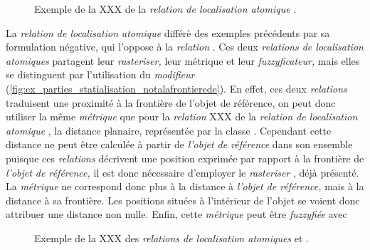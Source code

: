 \begin{figure}
  \centering  
  \caption{Exemple de la XXX de la \emph{relation de localisation
      atomique} \protect{}.}
  \label{fig:ex_parties_statialisation_dansplani}
\end{figure}

La \emph{relation de localisation atomique}
 différè des exemples
précédents par sa formulation négative, qui l'oppose à la
\emph{relation} . Ces deux
\emph{relations de localisation atomiques} partagent leur
\emph{rasteriser,} leur métrique et leur \emph{fuzzyficateur,} mais
elles se distinguent par l'utilisation du \emph{modifieur}
(\autoref{fig:ex_parties_statialisation_notalafrontierede}). En effet,
ces deux \emph{relations} traduisent une proximité à la frontière de
l'objet de référence, on peut donc utiliser la même \emph{métrique}
que pour la \emph{relation} XXX de la \emph{relation de localisation
  atomique} \protect{}, la
distance planaire, représentée par la classe
. Cependant cette distance ne peut être calculée à
partir de \emph{l'objet de référence} dans son ensemble puisque ces
\emph{relations} décrivent une position exprimée par rapport à la
frontière de \emph{l'objet de référence,} il est donc nécessaire
d'employer le \emph{rasteriser} , déjà
présenté. La \emph{métrique} ne correspond donc plus à la distance à
\emph{l'objet de référence,} mais à la distance à sa frontière. Les
positions situées à l'intérieur de l'objet se voient donc attribuer
une distance non nulle. Enfin, cette \emph{métrique} peut être
\emph{fuzzyfiée} avec 

\begin{figure}
  \centering  
  \caption{Exemple de la XXX des \emph{relations de localisation
      atomiques} \protect{} et
    \protect{}.}
  \label{fig:ex_parties_statialisation_notalafrontierede}
\end{figure}

